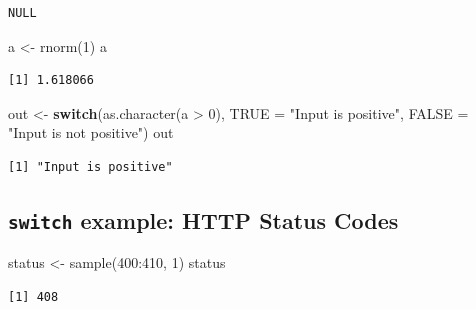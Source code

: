 \documentclass[
]{book}
\newenvironment{Shaded}{\begin{snugshade}}{\end{snugshade}}
\newcommand{\AttributeTok}[1]{\textcolor[rgb]{0.77,0.63,0.00}{#1}}
\newcommand{\ControlFlowTok}[1]{\textcolor[rgb]{0.13,0.29,0.53}{\textbf{#1}}}
\newcommand{\DecValTok}[1]{\textcolor[rgb]{0.00,0.00,0.81}{#1}}
\newcommand{\FunctionTok}[1]{\textcolor[rgb]{0.00,0.00,0.00}{#1}}
\newcommand{\NormalTok}[1]{#1}
\newcommand{\OtherTok}[1]{\textcolor[rgb]{0.56,0.35,0.01}{#1}}
\newcommand{\SpecialCharTok}[1]{\textcolor[rgb]{0.00,0.00,0.00}{#1}}
\newcommand{\StringTok}[1]{\textcolor[rgb]{0.31,0.60,0.02}{#1}}
\begin{document}
\begin{verbatim}
NULL
\end{verbatim}

\begin{Shaded}
\begin{Highlighting}[]
\NormalTok{a }\OtherTok{\textless{}{-}} \FunctionTok{rnorm}\NormalTok{(}\DecValTok{1}\NormalTok{)}
\NormalTok{a}
\end{Highlighting}
\end{Shaded}

\begin{verbatim}
[1] 1.618066
\end{verbatim}

\begin{Shaded}
\begin{Highlighting}[]
\NormalTok{out }\OtherTok{\textless{}{-}} \ControlFlowTok{switch}\NormalTok{(}\FunctionTok{as.character}\NormalTok{(a }\SpecialCharTok{\textgreater{}} \DecValTok{0}\NormalTok{),}
              \StringTok{\textasciigrave{}}\AttributeTok{TRUE}\StringTok{\textasciigrave{}} \OtherTok{=} \StringTok{"Input is positive"}\NormalTok{,}
              \StringTok{\textasciigrave{}}\AttributeTok{FALSE}\StringTok{\textasciigrave{}} \OtherTok{=} \StringTok{"Input is not positive"}\NormalTok{)}
\NormalTok{out}
\end{Highlighting}
\end{Shaded}

\begin{verbatim}
[1] "Input is positive"
\end{verbatim}

\hypertarget{switch-example-http-status-codes}{%
\subsection{\texorpdfstring{\texttt{switch} example: HTTP Status Codes}{switch example: HTTP Status Codes}}\label{switch-example-http-status-codes}}

\begin{Shaded}
\begin{Highlighting}[]
\NormalTok{status }\OtherTok{\textless{}{-}} \FunctionTok{sample}\NormalTok{(}\DecValTok{400}\SpecialCharTok{:}\DecValTok{410}\NormalTok{, }\DecValTok{1}\NormalTok{)}
\NormalTok{status}
\end{Highlighting}
\end{Shaded}

\begin{verbatim}
[1] 408
\end{verbatim}
\end{document}
